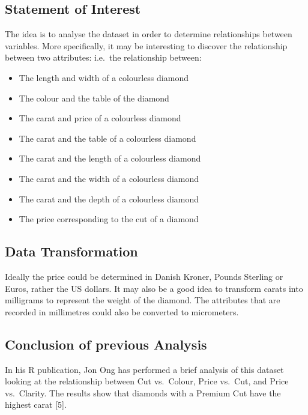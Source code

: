\documentclass[
]{article}
\providecommand{\tightlist}{%
  \setlength{\itemsep}{0pt}\setlength{\parskip}{0pt}}
\begin{document}
\newpage

\subsection{Statement of Interest}\label{statement-of-interest}

The idea is to analyse the dataset in order to determine relationships
between variables. More specifically, it may be interesting to discover
the relationship between two attributes: i.e.~the relationship between:

\begin{itemize}
\tightlist
\item
  The length and width of a colourless diamond
\item
  The colour and the table of the diamond
\item
  The carat and price of a colourless diamond
\item
  The carat and the table of a colourless diamond
\item
  The carat and the length of a colourless diamond
\item
  The carat and the width of a colourless diamond
\item
  The carat and the depth of a colourless diamond
\item
  The price corresponding to the cut of a diamond
\end{itemize}

\subsection{Data Transformation}\label{data-transformation}

Ideally the price could be determined in Danish Kroner, Pounds Sterling
or Euros, rather the US dollars. It may also be a good idea to transform
carats into milligrams to represent the weight of the diamond. The
attributes that are recorded in millimetres could also be converted to
micrometers.

\subsection{Conclusion of previous
Analysis}\label{conclusion-of-previous-analysis}

In his R publication, Jon Ong has performed a brief analysis of this
dataset looking at the relationship between Cut vs.~Colour, Price
vs.~Cut, and Price vs.~Clarity. The results show that diamonds with a
Premium Cut have the highest carat {[}5{]}.
\end{document}

